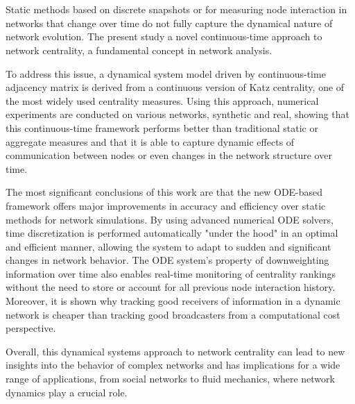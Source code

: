 
\chapter*{\abstractname}
Static methods based on discrete snapshots or  for measuring node interaction in networks that change over time do not fully capture the dynamical nature of network evolution. The present study  a novel continuous-time approach to network centrality, a fundamental concept in network analysis.


To address this issue, a dynamical system model driven by  continuous-time adjacency matrix  is derived from a continuous version of Katz centrality, one of the most widely used centrality measures. Using this approach, numerical experiments are conducted on various networks, synthetic and real, showing that this continuous-time framework performs better than traditional static or aggregate measures and that it is able to capture dynamic effects of communication between nodes or even changes in the network structure over time.

The most significant conclusions of this work are that the new ODE-based framework offers major improvements in accuracy and efficiency over static methods for network simulations. By using advanced numerical ODE solvers, time discretization is performed automatically "under the hood" in an optimal and efficient manner, allowing the system to adapt to sudden and significant changes in network behavior. The ODE system’s property of downweighting information over time also enables real-time monitoring of centrality rankings without the need to store or account for all previous node interaction history. Moreover, it is shown why tracking good receivers of information in a dynamic network is cheaper than tracking good broadcasters from a computational cost perspective. 

Overall, this dynamical systems approach to network centrality can lead to new insights into the behavior of complex networks and has implications for a wide range of applications, from social networks to fluid mechanics, where network dynamics play a crucial role.


